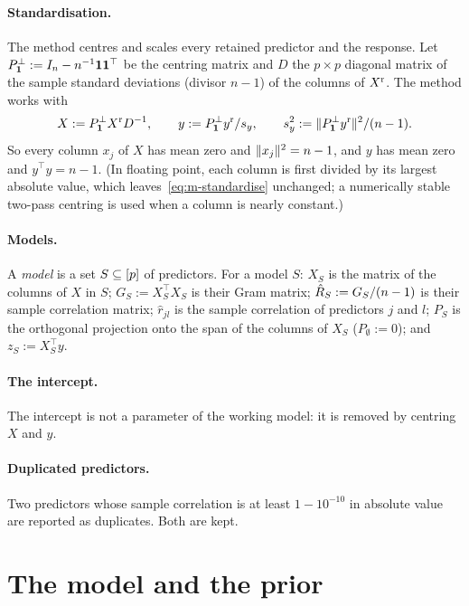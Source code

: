\documentclass[11pt]{article}
\begin{document}
\paragraph{Standardisation.} The method centres and scales every retained predictor and the response. Let
$P^\perp_{\mathbf{1}}:=I_n-n^{-1}\mathbf{1}\mathbf{1}^\top$ be the centring matrix and $D$ the $p\times p$ diagonal matrix of the sample
standard deviations (divisor $n-1$) of the columns of $X^{\mathrm r}$. The method works with
\begin{equation}\label{eq:m-standardise}
  X:=P^\perp_{\mathbf{1}}X^{\mathrm r} D^{-1},\qquad y:=P^\perp_{\mathbf{1}}y^{\mathrm r}/s_y,\qquad s_y^2:=\lVert P^\perp_{\mathbf{1}}y^{\mathrm r}\rVert^2/(n-1).
\end{equation}
So every column $x_j$ of $X$ has mean zero and $\lVert x_j\rVert^2=n-1$, and $y$ has mean zero and $y^\top y=n-1$. (In
floating point, each column is first divided by its largest absolute value, which leaves~\eqref{eq:m-standardise}
unchanged; a numerically stable two-pass centring is used when a column is nearly constant.)

\paragraph{Models.} A \emph{model} is a set $S\subseteq[p]$ of predictors. For a model $S$: $X_S$ is the matrix of
the columns of $X$ in $S$; $G_S:=X_S^\top X_S$ is their Gram matrix; $\hat R_S:=G_S/(n-1)$ is their sample correlation
matrix; $\hat r_{jl}$ is the sample correlation of predictors $j$ and $l$; $P_S$ is the orthogonal projection onto the span of the columns of $X_S$
($P_\emptyset:=0$); and $z_S:=X_S^\top y$.

\paragraph{The intercept.} The intercept is not a parameter of the working model: it is removed by centring $X$ and $y$.

\paragraph{Duplicated predictors.} Two predictors whose sample correlation is at least $1-10^{-10}$ in absolute value are
reported as duplicates. Both are kept.

\section{The model and the prior}\label{sec:m-prior}
\end{document}
